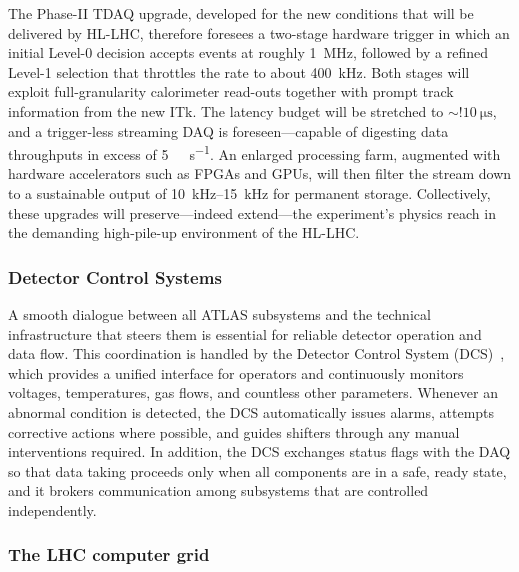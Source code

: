 The Phase-II TDAQ upgrade, developed for the new conditions that will be delivered by HL-LHC, therefore foresees a two-stage hardware trigger in which an initial Level-0 decision accepts events at roughly \SI{1}{\mega\hertz}, followed by a refined Level-1 selection that throttles the rate to about \SI{400}{\kilo\hertz}. Both stages will exploit full-granularity calorimeter read-outs together with prompt track information from the new ITk. The latency budget will be stretched to $\sim!\SI{10}{\micro\second}$, and a trigger-less streaming DAQ is foreseen—capable of digesting data throughputs in excess of \SI{5}{\tera\byte\per\second}. An enlarged processing farm, augmented with hardware accelerators such as FPGAs and GPUs, will then filter the stream down to a sustainable output of \SIrange{10}{15}{\kilo\hertz} for permanent storage. Collectively, these upgrades will preserve—indeed extend—the experiment’s physics reach in the demanding high-pile-up environment of the HL-LHC.

\subsubsection*{Detector Control Systems}
A smooth dialogue between all ATLAS subsystems and the technical infrastructure that steers them is essential for reliable detector operation and data flow. This coordination is handled by the Detector Control System (DCS)~\cite{atlas_DCS}, which provides a unified interface for operators and continuously monitors voltages, temperatures, gas flows, and countless other parameters. Whenever an abnormal condition is detected, the DCS automatically issues alarms, attempts corrective actions where possible, and guides shifters through any manual interventions required. In addition, the DCS exchanges status flags with the DAQ so that data taking proceeds only when all components are in a safe, ready state, and it brokers communication among subsystems that are controlled independently.

\subsubsection*{The LHC computer grid}

